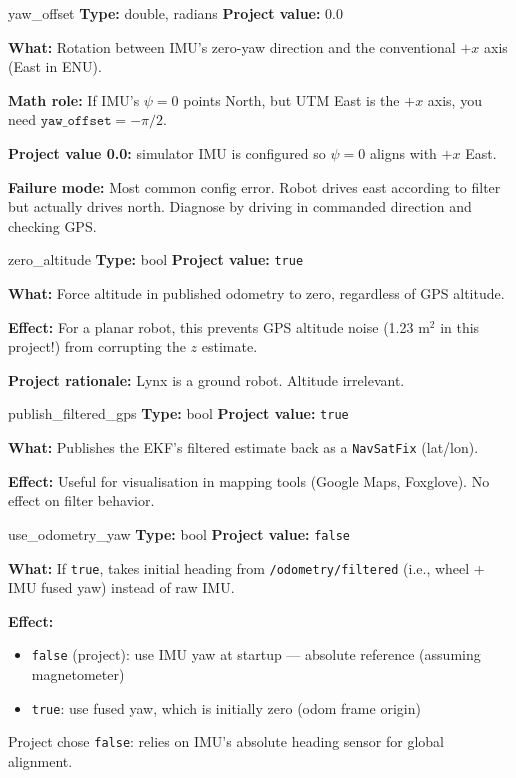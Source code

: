 \documentclass[11pt,a4paper]{article}
\begin{document}
\begin{paramcard}{yaw\_offset}
\textbf{Type:} double, radians \quad \textbf{Project value:} 0.0

\textbf{What:} Rotation between IMU's zero-yaw direction and the conventional $+x$ axis (East in ENU).

\textbf{Math role:} If IMU's $\psi=0$ points North, but UTM East is the $+x$ axis, you need $\texttt{yaw\_offset} = -\pi/2$.

\textbf{Project value 0.0:} simulator IMU is configured so $\psi = 0$ aligns with $+x$ East.

\textbf{Failure mode:} Most common config error. Robot drives east according to filter but actually drives north. Diagnose by driving in commanded direction and checking GPS.
\end{paramcard}

\begin{paramcard}{zero\_altitude}
\textbf{Type:} bool \quad \textbf{Project value:} \texttt{true}

\textbf{What:} Force altitude in published odometry to zero, regardless of GPS altitude.

\textbf{Effect:} For a planar robot, this prevents GPS altitude noise (1.23 m$^2$ in this project!) from corrupting the $z$ estimate.

\textbf{Project rationale:} Lynx is a ground robot. Altitude irrelevant.
\end{paramcard}

\begin{paramcard}{publish\_filtered\_gps}
\textbf{Type:} bool \quad \textbf{Project value:} \texttt{true}

\textbf{What:} Publishes the EKF's filtered estimate back as a \texttt{NavSatFix} (lat/lon).

\textbf{Effect:} Useful for visualisation in mapping tools (Google Maps, Foxglove). No effect on filter behavior.
\end{paramcard}

\begin{paramcard}{use\_odometry\_yaw}
\textbf{Type:} bool \quad \textbf{Project value:} \texttt{false}

\textbf{What:} If \texttt{true}, takes initial heading from \texttt{/odometry/filtered} (i.e., wheel + IMU fused yaw) instead of raw IMU.

\textbf{Effect:}
\begin{itemize}
\item \texttt{false} (project): use IMU yaw at startup --- absolute reference (assuming magnetometer)
\item \texttt{true}: use fused yaw, which is initially zero (odom frame origin)
\end{itemize}

Project chose \texttt{false}: relies on IMU's absolute heading sensor for global alignment.
\end{paramcard}
\end{document}
